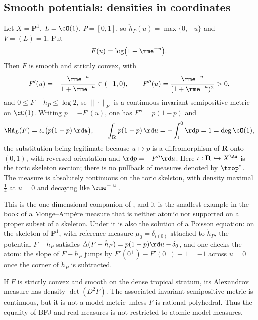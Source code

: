 \subsection{Smooth potentials: densities in coordinates}
\label{sec:ch31-toric-smooth}

\begin{example}
\label{ex:ch31-toric-logistic}
Let \(X=\mathbf P^1\), \(L=\cO(1)\), \(P=[0,1]\), so
\(\check h_P(u)=\max\{0,-u\}\) and \(V=(L)=1\).  Put
\[
 F(u)=\log\bigl(1+\rme^{-u}\bigr).
\]
Then \(F\) is smooth and strictly convex, with
\[
 F'(u)=-\frac{\rme^{-u}}{1+\rme^{-u}}\in(-1,0),
 \qquad
 F''(u)=\frac{\rme^{-u}}{(1+\rme^{-u})^2}>0,
\]
and \(0\leq F-\check h_P\leq\log2\), so \(\|\cdot\|_F\) is a continuous
invariant semipositive metric on \(\cO(1)\).  Writing \(p=-F'(u)\), one has
\(F''=p(1-p)\) and
\begin{equation}
\label{eq:ch31-logistic-measure}
 \MA_L(F)=\iota_*\bigl(p(1-p)\,\rd u\bigr),
 \qquad
 \int_{\mathbf R}p(1-p)\,\rd u
  =-\int_1^0\rd p=1=\deg\cO(1),
\end{equation}
the substitution being legitimate because \(u\mapsto p\) is a
diffeomorphism of \(\mathbf R\) onto \((0,1)\), with reversed orientation
and \(\rd p=-F''\rd u\).  Here
\(\iota:\mathbf R\hookrightarrow X^{\An}\) is the toric skeleton section;
there is no pullback of measures denoted by \(\trop^*\).
The measure is absolutely continuous on the toric skeleton, with density
maximal \(\tfrac14\) at \(u=0\) and decaying like \(\rme^{-|u|}\).

This is the one-dimensional companion of , and
it is the smallest example in the book of a Monge--Amp\`ere measure that is
neither atomic nor supported on a proper subset of a skeleton.  Under
 it is also the solution of a Poisson equation:
on the skeleton of \(\mathbf P^1\), with reference measure
\(\mu_0=\delta_{\iota(0)}\) attached to \(\check h_P\), the potential
\(F-\check h_P\) satisfies \(\Delta(F-\check h_P)=p(1-p)\rd u-\delta_0\), and
one checks the atom: the slope of \(F-\check h_P\) jumps by
\(F'(0^+)-F'(0^-)-1=-1\) across \(u=0\) once the corner of
\(\check h_P\) is subtracted.
\end{example}

\begin{example}
\label{ex:ch31-toric-smooth-not-model}
If \(F\) is strictly convex and smooth on the dense tropical stratum, its
Alexandrov measure has density \(\det(D^2F)\).  The associated invariant
semipositive metric is continuous, but it is not a model metric unless
\(F\) is rational polyhedral.  Thus the equality of BFJ and real measures is
not restricted to atomic model measures.
\end{example}

